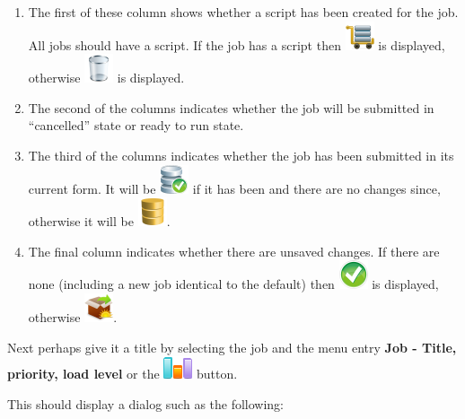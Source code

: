 \begin{enumerate}
\item The first of these column shows whether a script has been created for the job. All jobs should have
a script. If the job has a script then \includegraphics{img/hasscript.png} is displayed, otherwise
\includegraphics{img/noscript.png} is displayed.

\item The second of the columns indicates whether the job will be submitted in ``cancelled'' state or
ready to run state.

\item The third of the columns indicates whether the job has been submitted in its current form. It will
be \includegraphics{img/submitted.png} if it has been and there are no changes since, otherwise it
will be \includegraphics{img/unsubmitted.png}.

\item The final column indicates whether there are unsaved changes. If there are none (including a new
job identical to the default) then \includegraphics{img/saved.png} is displayed, otherwise
\includegraphics{img/changed.png}.
\end{enumerate}

Next perhaps give it a title by selecting the job and the menu entry \textbf{Job - Title, priority, load level}
or the \includegraphics{img/btqwtitprill.png} button.

This should display a dialog such as the following:


